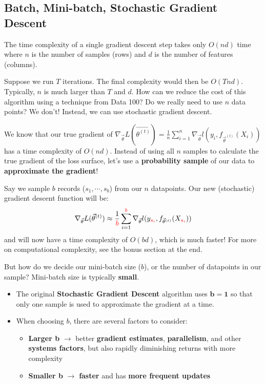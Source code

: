 \documentclass[
  letterpaper,
  DIV=11,
  numbers=noendperiod]{scrreprt}
\providecommand{\tightlist}{%
  \setlength{\itemsep}{0pt}\setlength{\parskip}{0pt}}\usepackage{longtable,booktabs,array}
\begin{document}
\subsection{Batch, Mini-batch, Stochastic Gradient
Descent}\label{batch-mini-batch-stochastic-gradient-descent}

The time complexity of a single gradient descent step takes only
\(O(nd)\) time where \(n\) is the number of samples (rows) and \(d\) is
the number of features (columns).

Suppose we run \(T\) iterations. The final complexity would then be
\(O(Tnd)\). Typically, \(n\) is much larger than \(T\) and \(d\). How
can we reduce the cost of this algorithm using a technique from Data
100? Do we really need to use \(n\) data points? We don't! Instead, we
can use stochastic gradient descent.

We know that our true gradient of
\(\nabla_{\vec{\theta}} L (\vec{\theta^{(t)}}) = \frac{1}{n}\sum_{i=1}^{n}\nabla_{\vec{\theta}} l(y_i, f_{\vec{\theta}^{(t)}}(X_i))\)
has a time complexity of \(O(nd)\). Instead of using all \(n\) samples
to calculate the true gradient of the loss surface, let's use a
\textbf{probability sample} of our data to \textbf{approximate the
gradient}!

Say we sample \(b\) records (\(s_1, \cdots, s_b\)) from our \(n\)
datapoints. Our new (stochastic) gradient descent function will be:
\[\nabla_{\vec{\theta}} L (\vec{\theta}^{(t)}) \approx \frac{1}{\textcolor{red}{b}}\sum_{i=1}^{\textcolor{red}{b}}\nabla_{\vec{\theta}} l(y_{\textcolor{red}{s_i}}, f_{\vec{\theta}^{(t)}}(X_{\textcolor{red}{s_i}}))\]
and will now have a time complexity of \(O(bd)\), which is much faster!
For more on computational complexity, see the bonus section at the end.

But how do we decide our mini-batch size (\(b\)), or the number of
datapoints in our sample? Mini-batch size is typically \textbf{small}.

\begin{itemize}
\tightlist
\item
  The original \textbf{Stochastic Gradient Descent} algorithm uses
  \(\boldsymbol{b=1}\) so that only one sample is used to approximate
  the gradient at a time.
\item
  When choosing \(b\), there are several factors to consider:

  \begin{itemize}
  \tightlist
  \item
    \textbf{Larger b} \(\rightarrow\) better \textbf{gradient
    estimates}, \textbf{parallelism}, and other \textbf{systems
    factors}, but also rapidly diminishing returns with more complexity
  \item
    \textbf{Smaller b} \(\rightarrow\) \textbf{faster} and has
    \textbf{more frequent updates}
  \end{itemize}
\end{itemize}
\end{document}
